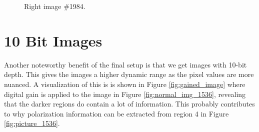 \begin{figure}[H]
    \centering
    \caption{Right image \#1984.
        \label{fig:picture_1984_right}}
    \label{fig:picture_1984}
\end{figure}

\section{10 Bit Images}
Another noteworthy benefit of the final setup is that we get images with 10-bit depth.
This gives the images a higher dynamic range as the pixel values are more nuanced.
A visualization of this is is shown in Figure \ref{fig:gained_image} where digital gain is applied to the image in Figure \ref{fig:normal_img_1536}, revealing that the darker regions do contain a lot of information.
This probably contributes to why polarization information can be extracted from region 4 in Figure \ref{fig:picture_1536}.

